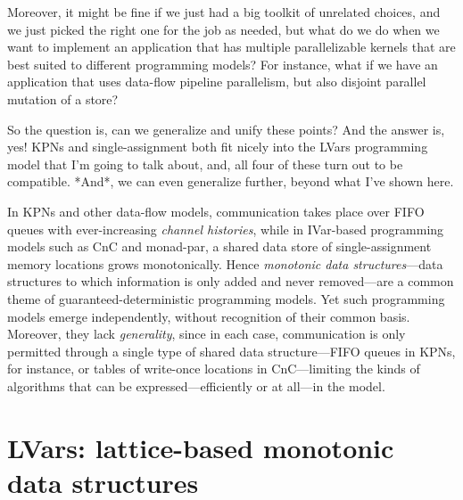 Moreover, it might be fine if we just had a big toolkit of unrelated
choices, and we just picked the right one for the job as needed, but
what do we do when we want to implement an application that has
multiple parallelizable kernels that are best suited to different programming models?
For instance, what if we have an application that uses
data-flow pipeline parallelism, but also disjoint parallel
mutation of a store?

So the question is, can we generalize and unify these points?  And the
answer is, yes!  KPNs and single-assignment both fit nicely into the
LVars programming model that I'm going to talk about, and, all four of
these turn out to be compatible.  *And*, we can even generalize
further, beyond what I've shown here.


In KPNs and other data-flow models, communication takes place over
FIFO queues with ever-increasing \emph{channel histories}, while in
IVar-based programming models such as CnC and monad-par, a shared data
store of single-assignment memory locations grows monotonically.
Hence \emph{monotonic data structures}---data structures to which
information is only added and never removed---are a common theme of
guaranteed-deterministic programming models.  Yet such programming
models emerge independently, without recognition of their common
basis.  Moreover, they lack \emph{generality}, since in each case,
communication is only permitted through a single type of shared data
structure---FIFO queues in KPNs, for instance, or tables of write-once
locations in CnC---limiting the kinds of algorithms that can be
expressed---efficiently or at all---in the model.

\section{LVars: lattice-based monotonic data structures}

